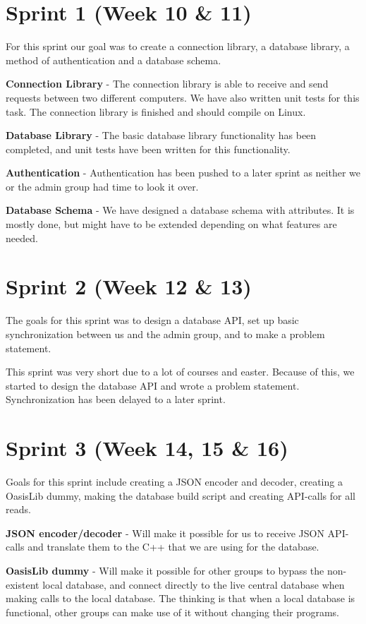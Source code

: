 \section{Sprint 1 (Week 10 \& 11)}
For this sprint our goal was to create a connection library, a database library, a method of authentication and a database schema.

\textbf{Connection Library} - The connection library is able to receive and send requests between two different computers. We have also written unit tests for this task. The connection library is finished and should compile on Linux.

\textbf{Database Library} - The basic database library functionality has been completed, and unit tests have been written for this functionality.

\textbf{Authentication} - Authentication has been pushed to a later sprint as neither we or the admin group had time to look it over.

\textbf{Database Schema} - We have designed a database schema with attributes. It is mostly done, but might have to be extended depending on what features are needed.

\section{Sprint 2 (Week 12 \& 13)}
The goals for this sprint was to design a database API, set up basic synchronization between us and the admin group, and to make a problem statement.

This sprint was very short due to a lot of courses and easter. Because of this, we started to design the database API and wrote a problem statement. Synchronization has been delayed to a later sprint.

\section{Sprint 3 (Week 14, 15 \& 16)}
Goals for this sprint include creating a JSON encoder and decoder, creating a OasisLib dummy, making the database build script and creating API-calls for all reads.

\textbf{JSON encoder/decoder} - Will make it possible for us to receive JSON API-calls and translate them to the C++ that we are using for the database.

\textbf{OasisLib dummy} - Will make it possible for other groups to bypass the non-existent local database, and connect directly to the live central database when making calls to the local database. The thinking is that when a local database is functional, other groups can make use of it without changing their programs.

